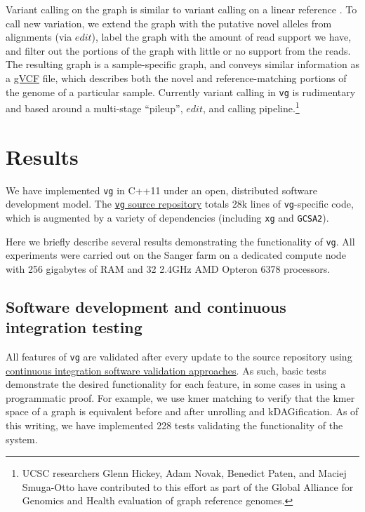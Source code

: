 \documentclass[12pt]{article}
\begin{document}
Variant calling on the graph is similar to variant calling on a linear reference \cite{samtools, garrison2012haplotype}.
To call new variation, we extend the graph with the putative novel alleles from alignments (via $edit$), label the graph with the amount of read support we have, and filter out the portions of the graph with little or no support from the reads.
The resulting graph is a sample-specific graph, and conveys similar information as a \href{http://samtools.github.io/hts-specs/VCFv4.2.pdf}{gVCF} file, which describes both the novel and reference-matching portions of the genome of a particular sample.
Currently variant calling in {\tt vg} is rudimentary and based around a multi-stage ``pileup'', $edit$, and calling pipeline.\footnote{UCSC researchers Glenn Hickey, Adam Novak, Benedict Paten, and Maciej Smuga-Otto have contributed to this effort as part of the Global Alliance for Genomics and Health evaluation of graph reference genomes.}

\section{Results}

We have implemented {\tt vg} in C++11 under an open, distributed software development model.
The \href{https://github.com/vgteam/vg}{{\tt vg} source repository} totals 28k lines of {\tt vg}-specific code, which is augmented by a variety of dependencies (including {\tt xg} and {\tt GCSA2}).

Here we briefly describe several results demonstrating the functionality of {\tt vg}.
All experiments were carried out on the Sanger farm on a dedicated compute node with 256 gigabytes of RAM and 32 2.4GHz AMD Opteron 6378 processors.

\subsection{Software development and continuous integration testing}

All features of {\tt vg} are validated after every update to the source repository using \href{https://travis-ci.org/vgteam/vg}{continuous integration software validation approaches}.
As such, basic tests demonstrate the desired functionality for each feature, in some cases in using a programmatic proof.
For example, we use kmer matching to verify that the kmer space of a graph is equivalent before and after unrolling and kDAGification.
As of this writing, we have implemented 228 tests validating the functionality of the system.
\end{document}
